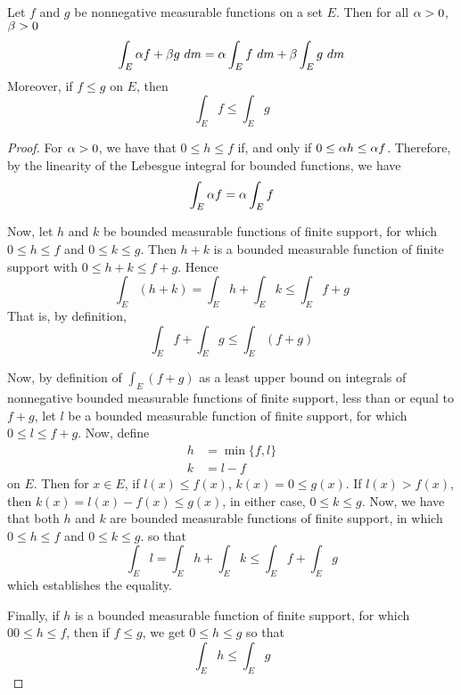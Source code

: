 \begin{theorem}\label{10.2.4}
    Let $f$ and  $g$ be nonnegative measurable functions on a set  $E$. Then for
    all  $\alpha>0$,  $\beta>0$
    \begin{equation*}
        \int_E{\a{f}+\b{g} \ dm}=\a\int_E{f \ dm}+\b\int_E{g \ dm}
    \end{equation*}
    Moreover, if $f \leq g$ on  $E$, then
    \begin{equation*}
        \int_E{f} \leq \int_E{g}
    \end{equation*}
\end{theorem}
\begin{proof}
    For $\alpha>0$, we have that  $0 \leq h  \leq f$ if, and only if  $0 \leq \alpha{h}
    \leq \alpha{f}$. Therefore, by the linearity of the Lebesgue integral for
    bounded functions, we have
    \begin{equation*}
        \int_E{\alpha{f}}=\alpha\int_E{f}
    \end{equation*}

    Now, let $h$ and  $k$ be bounded measurable functions of finite support, for
    which  $0 \leq h \leq f$ and  $0 \leq k \leq g$. Then  $h+k$ is a bounded
    measurable function of finite support with  $0 \leq h+k \leq f+g$. Hence
    \begin{equation*}
        \int_E{(h+k)}=\int_E{h}+\int_E{k} \leq \int_E{f+g}
    \end{equation*}
    That is, by definition,
    \begin{equation*}
        \int_E{f}+\int_E{g} \leq \int_E{(f+g)}
    \end{equation*}

    Now, by definition of $\int_E{(f+g)}$ as a least upper bound on integrals of
    nonnegative bounded measurable functions of finite support, less than or
    equal to $f+g$, let $l$ be a bounded measurable function of finite support,
    for which  $0 \leq l \leq f+g$. Now, define
    \begin{align*}
        h   &=  \min{\{f,l\}}   \\
        k   &= l-f
    \end{align*}
    on $E$. Then for  $x \in E$, if  $l(x) \leq f(x)$, $k(x)=0 \leq g(x)$. If
    $l(x)>f(x)$, then $k(x)=l(x)-f(x) \leq g(x)$, in either case, $0 \leq k \leq
    g$. Now, we have that both  $h$ and  $k$ are bounded measurable functions of
    finite support, in which  $0 \leq h \leq f$ and  $0 \leq k \leq g$. so that
    \begin{equation*}
        \int_E{l}=\int_E{h}+\int_E{k} \leq \int_E{f}+\int_E{g}
    \end{equation*}
    which establishes the equality.

    Finally, if $h$ is a bounded measurable function of finite support, for
    which  $0 0\leq h \leq f$, then if $f \leq g$, we get $0 \leq h \leq g$ so
    that
    \begin{equation*}
        \int_E{h} \leq \int_E{g}
    \end{equation*}
\end{proof}

